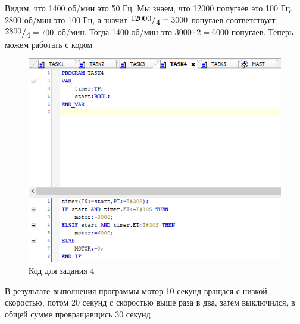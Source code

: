 \documentclass[a4paper, 16pt]{article}
\newcommand{\frc}[2]{\raisebox{2pt}{$#1$}\big/\raisebox{-3pt}{$#2$}}
\begin{document}
    \noindent Видим, что 1400 об/мин это 50 Гц. Мы знаем, что 12000 попугаев это 100 Гц.
    2800 об/мин это 100 Гц, а значит $\frc{12000}{4}=3000$ попугаев соответствует $\frc{2800}{4}=700$ об/мин.
    Тогда 1400 об/мин это $3000\cdot2=6000$ попугаев. Теперь можем работать с кодом
    \begin{figure}[h!]
        \centering
        \includegraphics[scale=0.8]{t4.png}
        \captionsetup{skip=0pt}
        \caption{Код для задания 4}
        \label{Рис:8}
    \end{figure}


    \noindent В результате выполнения программы мотор 10 секунд вращася с низкой скоростью,
    потом 20 секунд с скоростью выше раза в два, затем выключился, в общей сумме провращавщись 30 секунд


    \newpage
\end{document}
